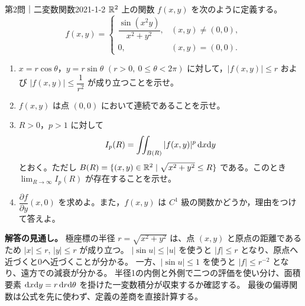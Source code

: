 \begin{problem}{第2問｜二変数関数}{2021-1-2}
$\mathbb{R}^2$ 上の関数 $f(x,y)$ を次のように定義する。
\[
f(x,y)=\begin{cases}\dfrac{\sin(x^2y)}{x^2+y^2},&(x,y)\ne(0,0),\\0,&(x,y)=(0,0).
\end{cases}
\]
\begin{enumerate}
  \item[(1)] $x=r\cos\theta$，$y=r\sin\theta$ $(r>0,\ 0\le\theta<2\pi)$ に対して，$|f(x,y)|\le r$ および $|f(x,y)|\le\dfrac1{r^2}$ が成り立つことを示せ。
  \item[(2)] $f(x,y)$ は点 $(0,0)$ において連続であることを示せ。
  \item[(3)] $R>0$，$p>1$ に対して
  \[
  I_p(R)=\iint_{B(R)}|f(x,y)|^p\,\mathrm{d} x\mathrm{d} y
  \]
  とおく。ただし $B(R)=\{(x,y)\in\mathbb{R}^2\mid\sqrt{x^2+y^2}\le R\}$ である。このとき $\lim_{R\to\infty}I_p(R)$ が存在することを示せ。
  \item[(4)] $\dfrac{\partial f}{\partial y}(x,0)$ を求めよ。また，$f(x,y)$ は $C^1$ 級の関数かどうか，理由をつけて答えよ。
\end{enumerate}
\end{problem}
\begin{memo*}
\textbf{解答の見通し。}
極座標の半径 $r=\sqrt{x^2+y^2}$ は、点 $(x,y)$ と原点の距離であるため
$|x|\le r$, $|y|\le r$ が成り立つ。
$|\sin u|\le|u|$ を使うと $|f|\le r$ となり、原点へ近づくと0へ近づくことが分かる。
一方、$|\sin u|\le1$ を使うと $|f|\le r^{-2}$ となり、遠方での減衰が分かる。
半径1の内側と外側で二つの評価を使い分け、面積要素
$\mathrm{d} x\mathrm{d} y=r\,\mathrm{d} r\mathrm{d}\theta$ を掛けた一変数積分が収束するか確認する。
最後の偏導関数は公式を先に使わず、定義の差商を直接計算する。
\end{memo*}
